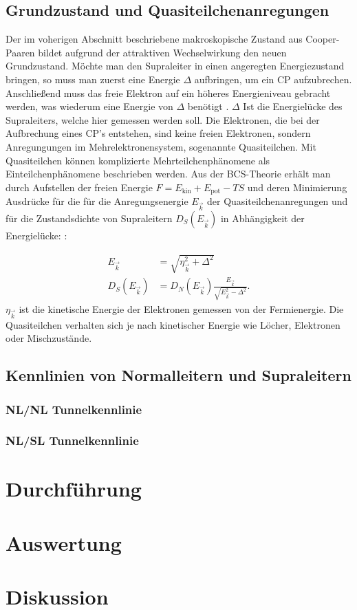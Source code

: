 \documentclass[twoside,        %
               BCOR12mm,       %
               english,ngerman, %
               fleqn,headsepline=false,footsepline=false
              ]{Vorlage/MFPREPORT}
\begin{document}
\subsection{Grundzustand und Quasiteilchenanregungen}
Der im voherigen Abschnitt beschriebene makroskopische Zustand aus
Cooper-Paaren bildet aufgrund der attraktiven Wechselwirkung den neuen
Grundzustand. Möchte man den Supraleiter in einen angeregten Energiezustand
bringen, so muss man zuerst eine Energie $\Delta$ aufbringen, um ein CP
aufzubrechen. Anschließend muss das freie Elektron auf ein höheres
Energieniveau gebracht werden, was wiederum eine Energie von $\Delta$ benötigt
\cite{tidecks1990current}. $\Delta$ Ist die Energielücke des Supraleiters,
welche hier gemessen werden soll. Die Elektronen, die bei der Aufbrechung eines CP's
entstehen, sind keine freien Elektronen, sondern Anregungungen im
Mehrelektronensystem, sogenannte Quasiteilchen. Mit Quasiteilchen können
komplizierte Mehrteilchenphänomene als Einteilchenphänomene beschrieben werden.
Aus der BCS-Theorie erhält man durch Aufstellen der freien Energie
$F=E_\text{kin}+E_\text{pot}-TS$ und deren Minimierung Ausdrücke für die
für die Anregungsenergie $E_{\vec{k}}$ der Quasiteilchenanregungen und für die
Zustandsdichte von Supraleitern $D_S(E_{\vec{k}})$ in Abhängigkeit der Energielücke: \cite[Kap.]{enss2011tieftemperaturphysik}:

\begin{align}
    \label{eq:BCS}
    E_{\vec k}&=\sqrt{\eta_{\vec{k}}^2+\Delta^2}\\
    D_S(E_{\vec{k}})&=D_N(E_{\vec{k}})\frac{E_{\vec k}}{\sqrt{E_{\vec
    k}^2-\Delta^2}}.
\end{align}
$\eta_{\vec k}$ ist die kinetische Energie der Elektronen gemessen von der
Fermienergie. Die Quasiteilchen verhalten sich je nach kinetischer Energie wie
Löcher, Elektronen oder Mischzustände.

\subsection{Kennlinien von Normalleitern und Supraleitern}
\subsubsection{NL/NL Tunnelkennlinie}
\subsubsection{NL/SL Tunnelkennlinie}
\section{Durchführung}
\label{sec:durchfuehrung}
\section{Auswertung}
\label{sec:auswertung}
\section{Diskussion}

\clearpage

%
%
%
%



\end{document}
